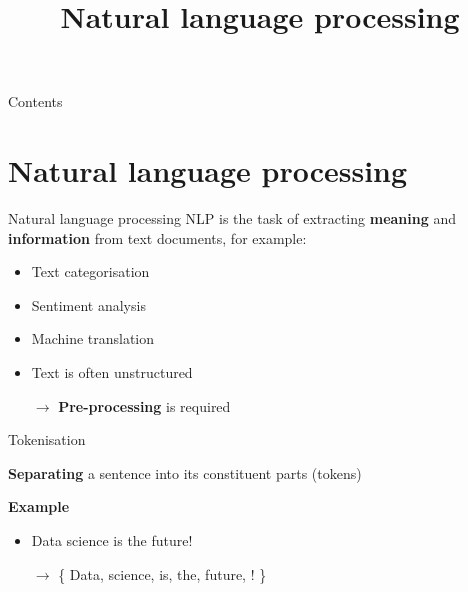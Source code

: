 

\title{Natural language processing}



\maketitle

\begin{frame}{Contents}
    \tableofcontents[hideallsubsections]
\end{frame}

\section{Natural language processing}

\begin{frame}{Natural language processing}
    NLP is the task of extracting \textbf{meaning} and \textbf{information} from
    text documents, for example:
    \begin{itemize}
        \item Text categorisation
        \item Sentiment analysis
        \item Machine translation
    \end{itemize}
    \vfill\pause
    \begin{itemize}
        \item Text is often unstructured
        \item[$\rightarrow$] \textbf{Pre\hyp{}processing} is required
    \end{itemize}
\end{frame}

\begin{frame}{Tokenisation}
    \begin{center}
        \textbf{Separating} a sentence into its constituent parts (tokens)
    \end{center}
    \vfill\pause
    \textbf{Example}
    \begin{itemize}
        \item Data science is the future!
        \item[$\rightarrow$] \{ Data, science, is, the, future, ! \}
    \end{itemize}
\end{frame}

